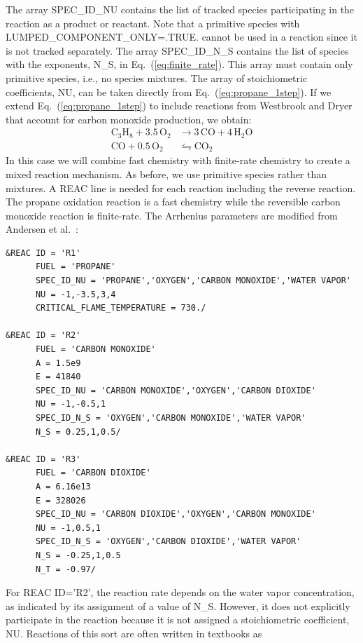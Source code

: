 \documentclass[11pt]{book}
\begin{document}
\noindent
The array {\ct SPEC\_ID\_NU} contains the list of tracked species participating in the reaction as a product or reactant.  Note that a primitive species with {\ct LUMPED\_COMPONENT\_ONLY=.TRUE.} cannot be used in a reaction since it is not tracked separately.  The array {\ct SPEC\_ID\_N\_S} contains the list of species with the exponents, {\ct N\_S}, in Eq.~(\ref{eq:finite_rate}).  This array must contain only primitive species, i.e., no species mixtures. The array of stoichiometric coefficients, {\ct NU}, can be taken directly from Eq.~(\ref{eq:propane_1step}). If we extend Eq.~(\ref{eq:propane_1step}) to include reactions from Westbrook and Dryer~\cite{Westbrook:1} that account for carbon monoxide production, we obtain:
\begin{align}\label{eq:propane_2step}
\mathrm{C_3H_8+3.5 \, O_2}&\rightarrow  \mathrm{3\,CO+4 \, H_2O} \\
\nonumber \mathrm{CO + 0.5 \, O_2} &\leftrightharpoons \mathrm{CO_2}
\end{align}
In this case we will combine fast chemistry with finite-rate chemistry to create a mixed reaction mechanism. As before, we use primitive species rather than mixtures. A {\ct REAC} line is needed for each reaction including the reverse reaction. The propane oxidation reaction is a fast chemistry while the reversible carbon monoxide reaction is finite-rate. The Arrhenius parameters are modified from Andersen et al.~\cite{AndersenJ:1}:

\begin{lstlisting}
&REAC ID = 'R1'
      FUEL = 'PROPANE'
      SPEC_ID_NU = 'PROPANE','OXYGEN','CARBON MONOXIDE','WATER VAPOR'
      NU = -1,-3.5,3,4
      CRITICAL_FLAME_TEMPERATURE = 730./

&REAC ID = 'R2'
      FUEL = 'CARBON MONOXIDE'
      A = 1.5e9
      E = 41840
      SPEC_ID_NU = 'CARBON MONOXIDE','OXYGEN','CARBON DIOXIDE'
      NU = -1,-0.5,1
      SPEC_ID_N_S = 'OXYGEN','CARBON MONOXIDE','WATER VAPOR'
      N_S = 0.25,1,0.5/

&REAC ID = 'R3'
      FUEL = 'CARBON DIOXIDE'
      A = 6.16e13
      E = 328026
      SPEC_ID_NU = 'CARBON DIOXIDE','OXYGEN','CARBON MONOXIDE'
      NU = -1,0.5,1
      SPEC_ID_N_S = 'OXYGEN','CARBON DIOXIDE','WATER VAPOR'
      N_S = -0.25,1,0.5
      N_T = -0.97/
\end{lstlisting}

\noindent For {\ct REAC ID='R2'}, the reaction rate depends on the water vapor concentration, as indicated by its assignment of a value of {\ct N\_S}. However, it does not explicitly participate in the reaction because it is not assigned a stoichiometric coefficient, {\ct NU}.  Reactions of this sort are often written in textbooks as
\end{document}

